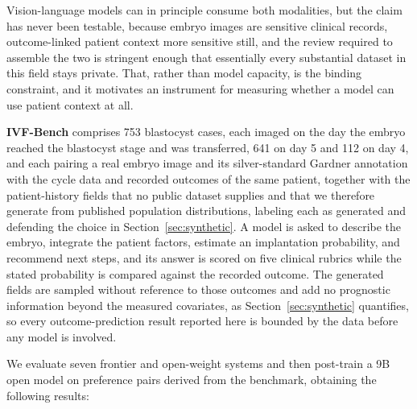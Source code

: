 \documentclass[11pt]{article}
\begin{document}
Vision-language models can in principle consume both modalities, but the claim
has never been testable, because embryo images are sensitive clinical records,
outcome-linked patient context more sensitive still, and the review required to
assemble the two is stringent enough that essentially every substantial dataset
in this field stays private. That, rather than model capacity, is the binding
constraint, and it motivates an instrument for measuring whether a model can use
patient context at all.

\textbf{IVF-Bench} comprises 753 blastocyst cases, each imaged on the day the
embryo reached the blastocyst stage and was transferred, 641 on day 5 and 112 on
day 4, and each pairing a real embryo image and its silver-standard Gardner
annotation with the cycle data and recorded outcomes of the same patient, together with the patient-history fields that no
public dataset supplies and that we therefore generate from published population
distributions, labeling each as generated and defending the choice in
Section~\ref{sec:synthetic}. A model is asked to describe the embryo, integrate
the patient factors, estimate an implantation probability, and recommend next
steps, and its answer is scored on five clinical rubrics while the stated
probability is compared against the recorded outcome. The generated fields are
sampled without reference to those outcomes and add no prognostic information
beyond the measured covariates, as Section~\ref{sec:synthetic} quantifies, so
every outcome-prediction result reported here is bounded by the data before any
model is involved.

We evaluate seven frontier and open-weight systems and then post-train a 9B open
model on preference pairs derived from the benchmark, obtaining the following results:
\end{document}
